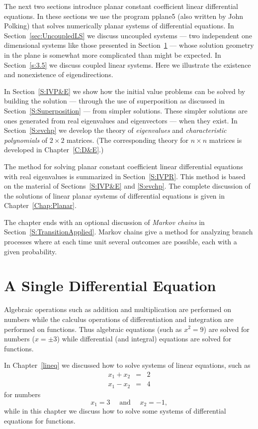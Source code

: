 The next two sections introduce planar constant coefficient linear
differential equations.  In these sections we use the program {\sf pplane5}
(also written by John Polking) that solves numerically planar systems of
differential equations.  In Section~\ref{sec:UncoupledLS} we discuss 
uncoupled systems --- two independent one dimensional systems like those 
presented in Section~\ref{S:growthmodels} --- whose solution geometry in the 
plane is somewhat more complicated than might be expected.  In 
Section~\ref{s:3.5} we discuss coupled linear systems.  Here we
illustrate the existence and nonexistence of eigendirections.

In Section~\ref{S:IVP&E} we show how the initial value problems can be solved 
by building the solution --- through the use of superposition as discussed in 
Section~\ref{S:Superposition} --- from simpler solutions.  These simpler
solutions are ones generated from real eigenvalues and eigenvectors
--- when they exist.  In Section~\ref{S:evchp} we develop the theory of  
{\em eigenvalues\/} and {\em characteristic polynomials\/} of $2\times 2$ 
matrices.  (The corresponding theory for $n\times n$ matrices is developed in 
Chapter~\ref{C:D&E}.)

The method for solving planar constant coefficient linear differential 
equations with real eigenvalues is summarized in Section~\ref{S:IVPR}.  This 
method is based on the material of Sections~\ref{S:IVP&E} and \ref{S:evchp}.  
The complete discussion of the solutions of linear planar systems of 
differential equations is given in Chapter~\ref{Chap:Planar}.

The chapter ends with an optional discussion of {\em Markov chains\/} in 
Section~\ref{S:TransitionApplied}.  Markov chains give a method for 
analyzing branch processes where at each time unit several outcomes are 
possible, each with a given probability.

\section{A Single Differential Equation}  \label{S:growthmodels}

Algebraic operations such as addition and multiplication are
performed on numbers while the calculus operations of
differentiation and integration are performed on functions.
Thus algebraic equations (such as $x^2=9$) are solved for
numbers ($x=\pm 3$) while differential (and integral) equations
are solved for functions.

In Chapter~\ref{lineq} we discussed how to solve systems of
linear equations, such as
\begin{eqnarray*}
x_1 + x_2 & = & 2 \\
x_1 - x_2 & = & 4
\end{eqnarray*}
for numbers
\[
x_1=3 \quad \mbox{ and } \quad x_2=-1,
\]
while in this chapter we discuss how to solve some systems of
differential equations for functions.

